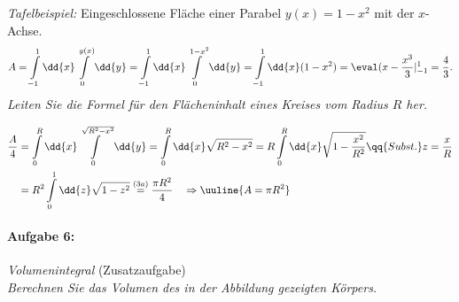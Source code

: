 \emph{Tafelbeispiel:} Eingeschlossene Fläche einer Parabel $y(x) = 1-x^2$ mit der $x$-Achse. 
\begin{align}
        A = \int\limits_{-1}^{1} \dd{x} \int\limits_{0}^{y(x)}\dd{y} = \int\limits_{-1}^{1}\dd{x} \int\limits_{0}^{1-x^2} \dd{y} = \int\limits_{-1}^{1}\dd{x} (1-x^2) = \eval(x-\frac{x^3}{3}|_{-1}^1 = \frac{4}{3}.
\end{align}
\emph{Leiten Sie die Formel für den Flächeninhalt eines Kreises vom Radius $R$ her.}
\begin{center}
\end{center}
\vspace{-1cm}
\begin{align}
    \frac{A}{4} &= \int\limits_{0}^{R} \dd{x} \int\limits_{0}^{\sqrt{R^2-x^2}}\dd{y} = \int\limits_{0}^{R} \dd{x} \sqrt{R^2-x^2} = R \int\limits_{0}^{R}\dd{x} \sqrt{1-\frac{x^2}{R^2}} \qq{Subst.} z = \frac{x}{R} \\
    &= R^2 \int\limits_{0}^{1} \dd{z} \sqrt{1-z^2} \overset{(3a)}{=} \frac{\pi R^2}{4} \quad \Rightarrow \uuline{A = \pi R^2}
\end{align}
%
\paragraph{Aufgabe 6: } \emph{Volumenintegral} \hfill (Zusatzaufgabe)\\[0.2cm]
\emph{Berechnen Sie das Volumen des in der Abbildung gezeigten Körpers.}

